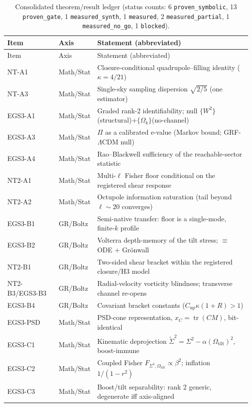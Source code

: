 \documentclass[11pt]{article}
\newcommand{\code}[1]{\texttt{\small #1}}
\newcommand{\Sig}{\Sigma^2}
\newcommand{\Sigt}{\widetilde{\Sigma}^2}
\newcommand{\Wsq}{W^2}
\newcommand{\Otilt}{\Omega_{\mathrm{tilt}}}
\newcommand{\Ok}{\Omega_{k}}
\begin{document}
\begin{longtable}{@{}lll@{}}
\caption{Consolidated theorem/result ledger (status counts: 6
\code{proven\_symbolic}, 13 \code{proven\_gate}, 1 \code{measured\_synth},
1 \code{measured}, 2 \code{measured\_partial}, 1 \code{measured\_no\_go},
1 \code{blocked}).}\label{tab:theorems}\\
\toprule
Item & Axis & Statement (abbreviated) \\
\midrule
\endfirsthead
\toprule Item & Axis & Statement (abbreviated) \\ \midrule \endhead
NT-A1 & Math/Stat & Closure-conditional quadrupole--filling identity ($\kappa=4/21$) \\
NT-A3 & Math/Stat & Single-sky sampling dispersion $\sqrt{2/5}$ (one estimator) \\
EGS3-A1 & Math/Stat & Graded rank-2 identifiability; null $\{\Wsq\}$(structural)$+\{\Ok\}$(no-channel) \\
EGS3-A3 & Math/Stat & $\Pi$ as a calibrated e-value (Markov bound; GRF-$\Lambda$CDM null) \\
EGS3-A4 & Math/Stat & Rao--Blackwell sufficiency of the reachable-sector statistic \\
NT2-A1 & Math/Stat & Multi-$\ell$ Fisher floor conditional on the registered shear response \\
NT2-A2 & Math/Stat & Octupole information saturation (tail beyond $\ell\!\sim\!20$ converges) \\
EGS3-B1 & GR/Boltz & Semi-native transfer: floor is a single-mode, finite-$k$ profile \\
EGS3-B2 & GR/Boltz & Volterra depth-memory of the tilt stress; $\equiv$ ODE $+$ Gr\"onwall \\
NT2-B1 & GR/Boltz & Two-sided shear bracket within the registered closure/H3 model \\
NT2-B3/EGS3-B3 & GR/Boltz & Radial-velocity vorticity blindness; transverse channel re-opens \\
EGS3-B4 & GR/Boltz & Covariant bracket constants ($C_{\mathrm{up}}\kappa(1{+}R)>1$) \\
EGS3-PSD & Math/Stat & PSD-cone representation, $x_C=\operatorname{tr}(CM)$, bit-identical \\
\midrule
EGS3-C1 & Math/Stat & Kinematic deprojection $\Sigt=\Sig-\alpha(\Otilt)^2$, boost-immune \\
EGS3-C2 & Math/Stat & Coupled Fisher $F_{\Sig,\Otilt}\!\propto\!\beta^2$; inflation $1/(1{-}r^2)$ \\
EGS3-C3 & Math/Stat & Boost/tilt separability: rank 2 generic, degenerate iff axis-aligned \\

\end{longtable}
\end{document}
